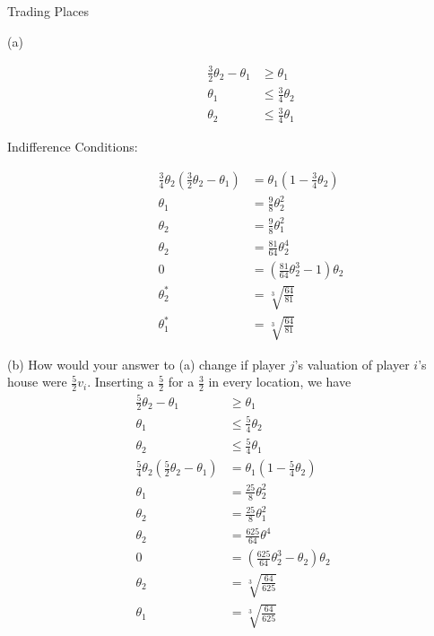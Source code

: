 \documentclass[9pt]{extarticle}
\begin{document}
\begin{problem}{Trading Places}
\begin{problem}{(a)}
\begin{description}
\begin{align*}
            \frac{3}{2}\theta_2 - \theta_1 &\geq \theta_1\\
            \theta_1 &\leq \frac{3}{4}\theta_2\\
            \theta_2 &\leq \frac{3}{4}\theta_1
          \end{align*}
        \item[Indifference Conditions:]
          \begin{align*}
            \frac{3}{4}\theta_2\left(\frac{3}{2}\theta_2-\theta_1\right) &= \theta_1 \left(1-\frac{3}{4}\theta_2\right)\\
            \theta_1 &= \frac{9}{8}\theta_2^2\\
            \theta_2 &= \frac{9}{8}\theta_1^2\\
            \theta_2 &= \frac{81}{64}\theta_2^4\\
            0 &= \left(\frac{81}{64}\theta_2^3-1\right)\theta_2\\
            \theta_2^{\ast} &= \sqrt[3]{\frac{64}{81}}\\
            \theta_1^{\ast} &= \sqrt[3]{\frac{64}{81}}
          \end{align*}
      \end{description}
    \end{problem}
    \begin{problem}{(b)}
      How would your answer to (a) change if player $j$'s valuation of player $i$'s house were $\frac{5}{2}v_i$.
      \tcblower
      Inserting a $\frac{5}{2}$ for a $\frac{3}{2}$ in every location, we have
      \begin{align*}
        \frac{5}{2}\theta_2 - \theta_1 &\geq \theta_1\tag*{Best Responses}\\
        \theta_1 &\leq \frac{5}{4}\theta_2\\
        \theta_2 &\leq \frac{5}{4}\theta_1\\
        \frac{5}{4}\theta_2\left(\frac{5}{2}\theta_2 - \theta_1\right) &= \theta_1 \left(1-\frac{5}{4}\theta_2\right)\tag*{Indifference Condition}\\
        \theta_1 &= \frac{25}{8}\theta_2^2\\
        \theta_2 &= \frac{25}{8}\theta_1^2\\
        \theta_2 &= \frac{625}{64}\theta^4\\
        0 &= \left(\frac{625}{64}\theta_2^3 - \theta_2\right)\theta_2\\
        \theta_2 &= \sqrt[3]{\frac{64}{625}}\\
        \theta_1 &= \sqrt[3]{\frac{64}{625}}

\end{align*}
\end{problem}
\end{problem}
\end{document}
